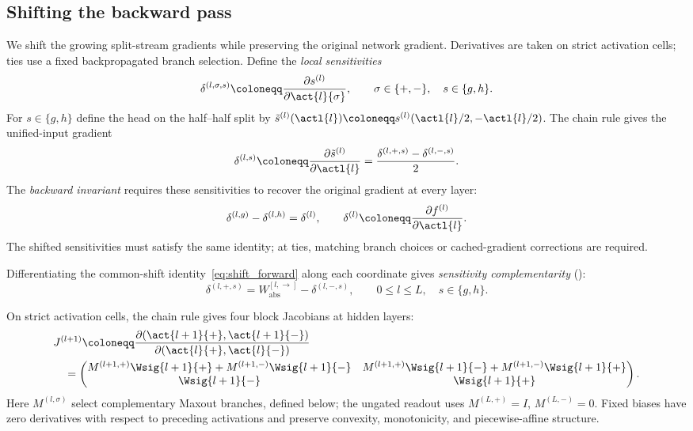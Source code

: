 \subsection{Shifting the backward pass}\label{subsec:backward_stabilization}

We shift the growing split-stream gradients while preserving the original network gradient. Derivatives are taken on strict activation cells; ties use a fixed backpropagated branch selection. Define the \emph{local sensitivities}
\begin{equation}
    \delta^{(l,\sigma,s)}\coloneqq\frac{\partial s^{(l)}}{\partial\act{l}{\sigma}},
    \qquad \sigma\in\{+,-\},\quad s\in\{g,h\}.
    \label{eq:local_sensitivities}
\end{equation}
For $s\in\{g,h\}$ define the head on the half--half split by $\tilde s^{(l)}(\actl{l})\coloneqq s^{(l)}(\actl{l}/2,-\actl{l}/2)$. The chain rule gives the unified-input gradient
\begin{equation}
\delta^{(l,s)}\coloneqq\frac{\partial\tilde s^{(l)}}{\partial\actl{l}}
=\frac{\delta^{(l,+,s)}-\delta^{(l,-,s)}}2.
\label{eq:unified_split_gradients}
\end{equation}
The \emph{backward invariant} requires these sensitivities to recover the original gradient at every layer:
\begin{equation}
\delta^{(l,g)}-\delta^{(l,h)}=\delta^{(l)},
\qquad
\delta^{(l)}\coloneqq\frac{\partial f^{(l)}}{\partial\actl{l}}.
\label{eq:stabilization_backward_invariant}
\end{equation}
The shifted sensitivities must satisfy the same identity; at ties, matching branch choices or cached-gradient corrections are required.

Differentiating the common-shift identity~\eqref{eq:shift_forward} along each coordinate gives \emph{sensitivity complementarity} ():
\begin{equation}
    \delta^{(l,+,s)}=W_{\mathrm{abs}}^{[l,\rightarrow]}-\delta^{(l,-,s)},
    \qquad 0\le l\le L,\quad s\in\{g,h\}.
    \label{eq:delta_complementarity}
\end{equation}

On strict activation cells, the chain rule gives four block Jacobians at hidden layers:
\begin{equation}
\begin{aligned}
&J^{(l+1)}\coloneqq\frac{\partial(\act{l+1}{+},\act{l+1}{-})}{\partial(\act{l}{+},\act{l}{-})}\\
&\quad=\begin{pmatrix}
M^{(l+1,+)}\Wsig{l+1}{+}+M^{(l+1,-)}\Wsig{l+1}{-}
& M^{(l+1,+)}\Wsig{l+1}{-}+M^{(l+1,-)}\Wsig{l+1}{+}\\
\Wsig{l+1}{-} & \Wsig{l+1}{+}
\end{pmatrix}.
\end{aligned}
\label{eq:split_layer_jacobians}
\end{equation}
Here $M^{(l,\sigma)}$ select complementary Maxout branches, defined below; the ungated readout uses $M^{(L,+)}=I$, $M^{(L,-)}=0$. Fixed biases have zero derivatives with respect to preceding activations and preserve convexity, monotonicity, and piecewise-affine structure.

